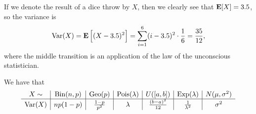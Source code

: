 \documentclass[11pt,a4paper]{article}
\begin{document}
\begin{example}
  If we denote the result of a dice throw by $X$,
  then we clearly see that $\mathbf{E}[X] = 3.5$,
  so the variance is
  \[
    \operatorname{Var}(X) =
    \mathbf{E}\left[ (X - 3.5)^2 \right] =
    \sum_{i=1}^{6} (i - 3.5)^2 \cdot \frac{1}{6} =
    \frac{35}{12},
  \]
  where the middle transition is an application of the law of the
  unconscious statistician.
\end{example}

\begin{remark}
  We have that
  \renewcommand\arraystretch{1.5}
\[
\begin{array}{c|c|c|c|c|c|c}
  X \sim & \mathrm{Bin}(n,p) & \mathrm{Geo}(p) & \mathrm{Pois}(\lambda) 
         & U([a,b]) & \operatorname{Exp}(\lambda) & N(\mu,\sigma^2) \\ \hline
  \operatorname{Var}(X) & np(1-p) & \frac{1-p}{p^2} & \lambda 
          & \tfrac{(b-a)^2}{12} & \frac{1}{\lambda^2} & \sigma^2
\end{array}
\]
\end{remark}
\end{document}
